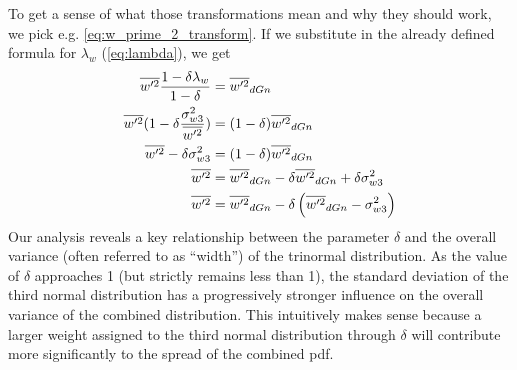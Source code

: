 To get a sense of what those transformations mean and why they should work,
we pick e.g. \cref{eq:w_prime_2_transform}.
If we substitute in the already defined formula for $\lambda_w$ (\cref{eq:lambda}), we get
\begin{align*}
    \overline{w'^2} \frac{1 - \delta\lambda_w}{1 - \delta}
    &= \overline{w'^2}_{dGn} \\
    \overline{w'^2} (1 - \delta\frac{\sigma_{w 3}^2}{\overline{w'^2}})
    &= (1 - \delta)\overline{w'^2}_{dGn} \\
    \overline{w'^2} - \delta\sigma_{w 3}^2
    &= (1 - \delta)\overline{w'^2}_{dGn} \\
    \overline{w'^2}
    &= \overline{w'^2}_{dGn} - \delta\overline{w'^2}_{dGn} + \delta\sigma_{w 3}^2 \\
    \overline{w'^2}
    &= \overline{w'^2}_{dGn} - \delta\left(\overline{w'^2}_{dGn} - \sigma_{w 3}^2\right)
\end{align*}
Our analysis reveals a key relationship between the parameter $\delta$
and the overall variance (often referred to as \enquote{width}) of the trinormal distribution.
As the value of $\delta$ approaches 1 (but strictly remains less than 1),
the standard deviation of the third normal distribution
has a progressively stronger influence on the overall variance of the combined distribution.
This intuitively makes sense because a larger weight assigned to the third normal distribution through $\delta$
will contribute more significantly to the spread of the combined \gls{pdf}.

